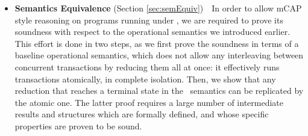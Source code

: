 \begin{itemize}
	\item \textbf{Semantics Equivalence} (Section \ref{sec:semEquiv})\ \ In order to allow mCAP style reasoning on programs running under \tpl, we are required to prove its soundness with respect to the operational semantics we introduced earlier. This effort is done in two steps, as we first prove the soundness in terms of a baseline operational semantics, which does not allow any interleaving between concurrent transactions by reducing them all at once: it effectively runs transactions atomically, in complete isolation. Then, we show that any reduction that reaches a terminal state in the \tpl\ semantics can be replicated by the atomic one. The latter proof requires a large number of intermediate results and structures which are formally defined, and whose specific properties are proven to be sound.
\end{itemize}